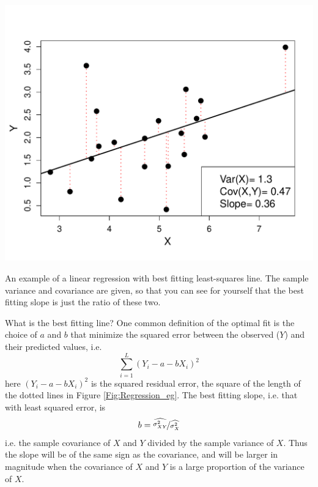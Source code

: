  \begin{marginfigure}
 \begin{center}
   \includegraphics[width=\textwidth]{math_background/dist_pics/Linear_regression.pdf}\end{center}
 \caption{An example of a linear regression with best fitting
   least-squares line. The sample variance and covariance are given,
   so that you can see for yourself that the best fitting slope is
   just the ratio of these two. 
   }\label{Fig:Regression_eg}
 \end{marginfigure}

What
is the best fitting line? One common definition of the optimal fit is
the choice of $a$ and $b$ that minimize the squared error
between the observed ($Y$) and their predicted values, i.e.
\begin{equation}
\sum_{i=1}^L  (Y_i  - a -  b X_i )^2
\end{equation}
here $(Y_i  - a -  b X_i)^2$ is the squared residual error, the square
of the length of the dotted lines in Figure
\ref{Fig:Regression_eg}. The best fitting slope, i.e. that with least
squared error, is
\begin{equation}
b = \nicefrac{ \widehat{\sigma_{XY}^2}}{ \widehat{\sigma_{X}^2}} \label{eqn:slope_linear_reg}
\end{equation}
i.e. the sample covariance of $X$ and $Y$ divided by the sample
variance of $X$. Thus the slope will be of the same sign as the
covariance, and will be larger in magnitude when the covariance of $X$
and $Y$ is a large proportion of the variance of $X$.


